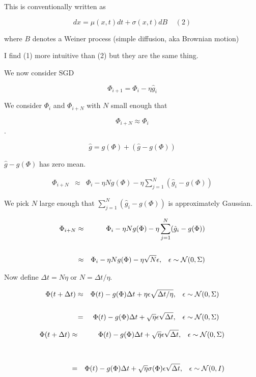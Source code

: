 {\vfill
This is conventionally written as

$$dx = \mu(x,t)dt + \sigma(x,t)dB\;\;\;\;(2)$$

\vfill
where $B$ denotes a Weiner process (simple diffusion, aka Brownian motion)

\vfill
I find (1) more intuitive than (2) but they are the same thing.


\vfill
We now consider SGD

$$\Phi_{i+1} = \Phi_i - \eta\hat{g}_i$$

\vfill
We consider $\Phi_i$ and $\Phi_{i+N}$ with $N$ small enough that

$$\Phi_{i+N} \approx \Phi_i$$.


$$\hat{g} = g(\Phi) + (\hat{g} - g(\Phi))$$

\vfill
$\hat{g} - g(\Phi)$ has zero mean.

\begin{eqnarray*}
\Phi_{i+N} & \approx & \Phi_i - \eta N g(\Phi)  - \eta \sum_{j=1}^N (\hat{g}_i - g(\Phi))
\end{eqnarray*}

\vfill
We pick $N$ large enough that $\sum_{j=1}^N (\hat{g}_i - g(\Phi))$ is approximately Gaussian.


\begin{eqnarray*}
\Phi_{i+N} & \approx & \Phi_i - \eta N g(\Phi)  - \eta \sum_{j=1}^N (\hat{g}_i - g(\Phi)) \\
\\
& \approx & \Phi_i - \eta N g(\Phi)  - \eta \sqrt{N} \epsilon,\;\;\; \epsilon \sim {\cal N}(0,\Sigma)
\end{eqnarray*}

\vfill
Now define $\Delta t = N\eta$ or $N = \Delta t/\eta$.

\begin{eqnarray*}
\Phi(t+ \Delta t) & \approx & \Phi(t) - g(\Phi)\Delta t +  \eta\epsilon \sqrt{ \Delta t/\eta},\;\;\; \epsilon \sim {\cal N}(0,\Sigma) \\
\\
& = & \Phi(t) - g(\Phi)\Delta t +  \sqrt{\eta}\epsilon \sqrt{\Delta t},\;\;\; \epsilon \sim {\cal N}(0,\Sigma)
\end{eqnarray*}



\begin{eqnarray*}
\Phi(t+ \Delta t) & \approx & \Phi(t) - g(\Phi)\Delta t +  \sqrt{\eta}\epsilon \sqrt{ \Delta t},\;\;\; \epsilon \sim {\cal N}(0,\Sigma) \\
\\
\\
& = & \Phi(t) - g(\Phi)\Delta t +  \sqrt{\eta}\sigma(\Phi) \epsilon \sqrt{ \Delta t},\;\;\; \epsilon \sim {\cal N}(0,I) 
\end{eqnarray*}

}
